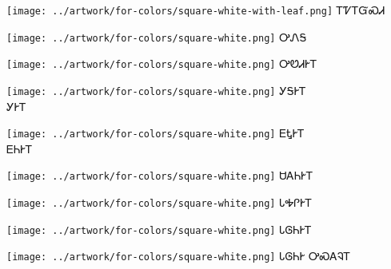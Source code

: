 \documentclass[avery5371]{flashcards}%
\begin{document}

\begin{flashcard}{
\texttt{[image: ../artwork/for-colors/square-white-with-leaf.png]}
}\Huge ᎢᏤᎢᏳᏍᏗ
\end{flashcard}

\begin{flashcard}{
\texttt{[image: ../artwork/for-colors/square-white.png]}
}\Huge ᎤᏁᎦ
\end{flashcard}

\begin{flashcard}{
\texttt{[image: ../artwork/for-colors/square-white.png]}
}\Huge ᎤᏬᏗᎨᎢ
\end{flashcard}

\begin{flashcard}{
\texttt{[image: ../artwork/for-colors/square-white.png]}
}\Huge ᎩᎦᎨᎢ\\ᎩᎨᎢ
\end{flashcard}

\begin{flashcard}{
\texttt{[image: ../artwork/for-colors/square-white.png]}
}\Huge ᎬᎿᎨᎢ\\ᎬᏂᎨᎢ
\end{flashcard}

\begin{flashcard}{
\texttt{[image: ../artwork/for-colors/square-white.png]}
}\Huge ᏌᎪᏂᎨᎢ
\end{flashcard}

\begin{flashcard}{
\texttt{[image: ../artwork/for-colors/square-white.png]}
}\Huge ᏓᎭᎵᎨᎢ
\end{flashcard}

\begin{flashcard}{
\texttt{[image: ../artwork/for-colors/square-white.png]}
}\Huge ᏓᎶᏂᎨᎢ
\end{flashcard}

\begin{flashcard}{
\texttt{[image: ../artwork/for-colors/square-white.png]}
}\Huge ᏓᎶᏂᎨ ᎤᏍᎪᎸᎢ
\end{flashcard}
\end{document}

